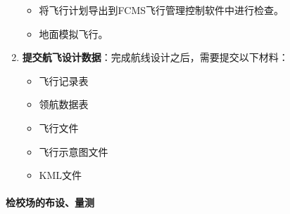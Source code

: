 \begin{enumerate}
\begin{itemize}
			\item 将飞行计划导出到FCMS飞行管理控制软件中进行检查。
			\item 地面模拟飞行。
		\end{itemize}
	\item \textbf{提交航飞设计数据}：完成航线设计之后，需要提交以下材料：
		\begin{itemize}
			\item 飞行记录表
			\item 领航数据表
			\item 飞行文件
			\item 飞行示意图文件
			\item KML文件
		\end{itemize}
\end{enumerate}

\paragraph{检校场的布设、量测}
